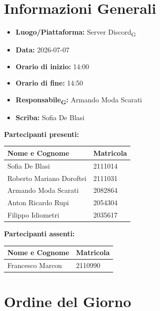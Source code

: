 \section{Informazioni Generali}
\begin{itemize}
    \item \textbf{Luogo/Piattaforma:} Server Discord\textsubscript{G}
    \item \textbf{Data:} 2026-07-07
    \item \textbf{Orario di inizio:} 14:00
    \item \textbf{Orario di fine:} 14:50
    \item \textbf{Responsabile\textsubscript{G}:} Armando Moda Scarati
    \item \textbf{Scriba:} Sofia De Blasi
\end{itemize}

\vspace{0.5cm}
\textbf{Partecipanti presenti:}
\begin{table}[ht]
    \centering
    \renewcommand{\arraystretch}{1.2}
    \begin{tabularx}{\textwidth}{X l}
        \toprule
        \textbf{Nome e Cognome} & \textbf{Matricola} \\
        \midrule
        Sofia De Blasi & 2111014 \\
        Roberto Mariano Doroftei & 2111031 \\
        Armando Moda Scarati & 2082864 \\
        Anton Ricardo Rupi & 2054304 \\
        Filippo Idiometri & 2035617 \\
        \bottomrule
    \end{tabularx}
\end{table}

\vspace{0.5cm}
\textbf{Partecipanti assenti:}
\begin{table}[ht]
    \centering
    \renewcommand{\arraystretch}{1.2}
    \begin{tabularx}{\textwidth}{X l}
        \toprule
        \textbf{Nome e Cognome} & \textbf{Matricola} \\
        \midrule
        Francesco Marcon & 2110990 \\
        \bottomrule
    \end{tabularx}
\end{table}

\section{Ordine del Giorno}

